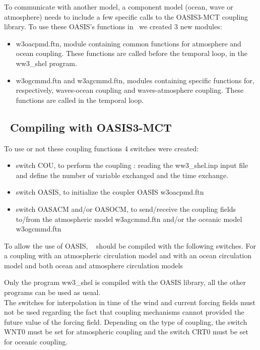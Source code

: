 To communicate with another model, a component model (ocean, wave or atmosphere) needs to include a few specific calls to the OASIS3-MCT coupling library. To use these OASIS's functions in \ws\ we created 3 new modules:
\begin{itemize}
\item {\file w3oacpmd.ftn}, module containing common functions for atmosphere and ocean coupling. These functions are called before the temporal loop, in the {\code ww3\_shel} program.
\item {\file w3ogcmmd.ftn} and {\file w3agcmmd.ftn}, modules containing specific functions for, respectively, waves-ocean coupling and waves-atmosphere coupling.  These functions are called in the temporal loop.
\end{itemize}

\vssub
\subsection{~Compiling with OASIS3-MCT} \label{sec:couplingB}
\vssub

To use or not these coupling functions 4 switches were created: 

\begin{itemize}
\item switch {\code COU}, to perform the coupling : reading the {\file ww3\_shel.inp} input file and define the number of variable exchanged and the time exchange.
\item switch {\code OASIS}, to initialize the coupler OASIS {\file w3oacpmd.ftn}
\item switch {\code OASACM} and/or {\code OASOCM}, to send/receive the coupling fields to/from the atmospheric model {\file w3agcmmd.ftn} and/or the oceanic model {\file w3ogcmmd.ftn}
\end{itemize}

To allow the use of OASIS, \ww~ should be compiled with the following switches. For 
a coupling with an atmospheric circulation model 
and with an ocean circulation model
and both ocean and atmosphere circulation models 

Only the program {\code ww3\_shel} is compiled with the OASIS library, all the other programs can be used as usual. \\

The switches for interpolation in time of the wind and current forcing fields must not be used regarding the
fact that coupling mechanisms cannot provided the future value of the forcing field.
Depending on the type of coupling, the switch {\code WNT0} must be set for atmospheric coupling and the switch {\code CRT0} must be set for oceanic coupling.

